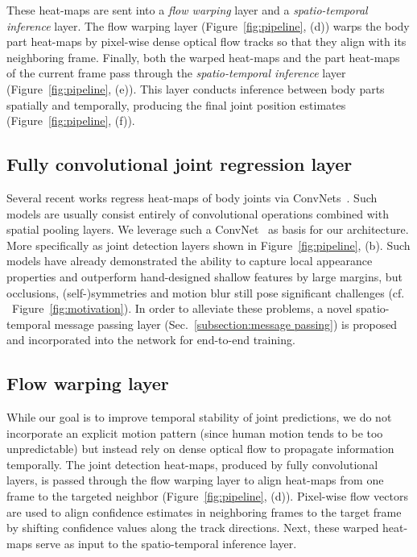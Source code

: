 \documentclass[10pt,twocolumn,letterpaper]{article}
\newcommand{\figref}[1]{Figure~\ref{#1}}
\newcommand{\secref}[1]{Sec.~\ref{#1}}
\begin{document}
These heat-maps are sent into a \emph{flow warping} layer and a \emph{spatio-temporal inference} layer. The flow warping layer (\figref{fig:pipeline}, (d)) warps the body part heat-maps by pixel-wise dense optical flow tracks so that they align with its neighboring frame. Finally, both the warped heat-maps and the part heat-maps of the current frame pass through the \emph{spatio-temporal inference} layer (\figref{fig:pipeline}, (e)). This layer conducts inference between body parts spatially and temporally, producing the final joint position estimates (\figref{fig:pipeline}, (f)).

\subsection{Fully convolutional joint regression layer}\label{subsection:fully ConvNet}
Several recent works regress heat-maps of body joints
via ConvNets~\cite{chen2014articulated,ouyang2014multi,pishchulin2015deepcut,tompson2014joint,wei2016cpm,newell2016stacked}. Such models are usually consist entirely of convolutional operations combined with spatial pooling layers. We leverage such a ConvNet~\cite{wei2016cpm} as basis for our architecture. More specifically as joint detection layers shown in \figref{fig:pipeline}, (b). Such models have already demonstrated the ability to capture local appearance properties and outperform hand-designed shallow features by large margins, but occlusions, (self-)symmetries and motion blur still pose significant challenges (cf. ~\figref{fig:motivation}). In order to alleviate these problems, a novel spatio-temporal message passing layer (\secref{subsection:message passing}) is proposed and incorporated into the network for end-to-end training.

\subsection{Flow warping layer}\label{subsection:flow-layer}
While our goal is to improve temporal stability of joint predictions, we do not incorporate an explicit motion pattern (since human motion tends to be too unpredictable) but instead rely on dense optical flow to propagate information temporally. The joint detection heat-maps, produced by fully convolutional layers, is passed through the flow warping layer to align heat-maps from one frame to the targeted neighbor (\figref{fig:pipeline}, (d)).
Pixel-wise flow vectors are used to align confidence estimates in neighboring frames to the target frame by shifting confidence values along the track directions. Next, these warped heat-maps serve as input to the spatio-temporal inference layer.
\end{document}
